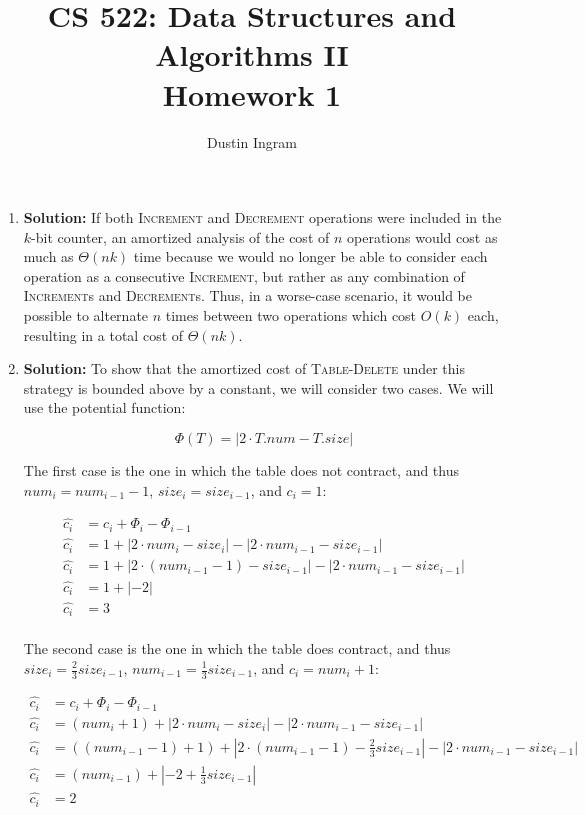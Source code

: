 \documentclass{article}
\title{CS 522: Data Structures and Algorithms II \\ Homework 1}
\author{Dustin Ingram}
\begin{document}
\maketitle
\begin{enumerate}
    \item \textbf{Solution:}
    If both \textsc{Increment} and \textsc{Decrement} operations were included
    in the $k$-bit counter, an amortized analysis of the cost of $n$ operations
    would cost as much as $\Theta(nk)$ time because we would no longer be able
    to consider each operation as a consecutive \textsc{Increment}, but rather
    as any combination of \textsc{Increment}s and \textsc{Decrement}s. Thus, in
    a worse-case scenario, it would be possible to alternate $n$ times between
    two operations which cost $O(k)$ each, resulting in a total cost of
    $\Theta(nk)$.

    \item \textbf{Solution:}
    To show that the amortized cost of \textsc{Table-Delete} under this strategy
    is bounded above by a constant, we will consider two cases. We will use the
    potential function:

    $$ \Phi(T) = | 2\cdot T.num - T.size | $$

    The first case is the one in which the table does not contract, and thus
    $num_{i} = num_{i-1}-1$, $size_{i} = size_{i-1}$, and $c_{i} = 1$:

    \begin{align*}
        \hat{c_{i}} &= c_{i} + \Phi_{i} - \Phi_{i-1} \\
        \hat{c_{i}} &= 1 + |2\cdot num_{i} - size_{i}| - | 2\cdot num_{i-1} - size_{i-1} | \\
        \hat{c_{i}} &= 1 + |2\cdot(num_{i-1} - 1) - size_{i-1}| - | 2\cdot num_{i-1} - size_{i-1} | \\
        \hat{c_{i}} &= 1 + |-2| \\
        \hat{c_{i}} &= 3 \\
    \end{align*}

    The second case is the one in which the table does contract, and thus
    $size_{i} = \frac{2}{3}size_{i-1}$, $num_{i-1} = \frac{1}{3}size_{i-1}$, and
    $c_{i} = num_{i} + 1$:

    \begin{align*}
        \hat{c_{i}} &= c_{i} + \Phi_{i} - \Phi_{i-1} \\
        \hat{c_{i}} &= (num_{i} +1) + |2\cdot num_{i} - size_{i}| - | 2\cdot num_{i-1} - size_{i-1} | \\
        \hat{c_{i}} &= ((num_{i-1} - 1) + 1) + |2\cdot(num_{i-1} - 1) - \frac{2}{3}size_{i-1}| - | 2\cdot num_{i-1} - size_{i-1} | \\
        \hat{c_{i}} &= (num_{i-1}) + |-2 + \frac{1}{3}size_{i-1}| \\
        \hat{c_{i}} &= 2 \\
    \end{align*}


\end{enumerate}
\end{document}
